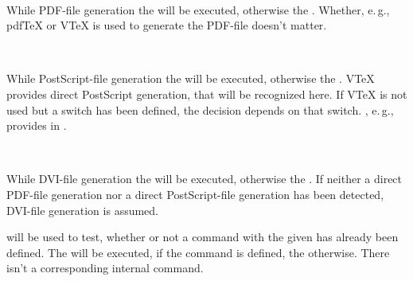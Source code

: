 \begin{Declaration}
  \\
\end{Declaration}
%
%
While PDF-file generation the  will be executed,
otherwise the . Whether, e.\,g., pdf\TeX{} or V\TeX{}
is used to generate the PDF-file doesn't matter.
%
%
%


\begin{Declaration}
  \\
\end{Declaration}
%
%
While PostScript-file generation the  will be executed,
otherwise the . V\TeX{} provides direct PostScript
generation, that will be recognized here. If V\TeX{} is not used but a switch
 has been defined, the decision depends on that
switch. \KOMAScript{}, e.\,g., provides  in
.
%
%
%


\begin{Declaration}
  \\
\end{Declaration}
%
%
While DVI-file generation the  will be executed,
otherwise the . If neither a direct PDF-file
generation nor a direct PostScript-file generation has been detected, DVI-file
generation is assumed.
%
%
%


\begin{Declaration}
\end{Declaration}
%
\eTeX{} will be used to test, whether or not a command with the given
 has already been defined. The  will be
executed, if the command is defined, the 
otherwise. There isn't a corresponding internal command.
%
%


